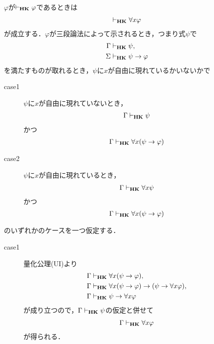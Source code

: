 	\begin{sketch}
		$\varphi$が$\vdash_{{\scriptsize \mbox{{\bf HK}}}} \varphi$であるときは
		\begin{align}
			\vdash_{{\scriptsize \mbox{{\bf HK}}}} \forall x \varphi
		\end{align}
		が成立する．$\varphi$が三段論法によって示されるとき，つまり式$\psi$で
		\begin{align}
			\Gamma &\vdash_{{\scriptsize \mbox{{\bf HK}}}} \psi, \\
			\Sigma &\vdash_{{\scriptsize \mbox{{\bf HK}}}} \psi \rightarrow \varphi
		\end{align}
		を満たすものが取れるとき，$\psi$に$x$が自由に現れているかいないかで
		\begin{description}
			\item[case1] $\psi$に$x$が自由に現れていないとき，
				\begin{align}
					\Gamma \vdash_{{\scriptsize \mbox{{\bf HK}}}} \psi
				\end{align}
				かつ
				\begin{align}
					\Gamma \vdash_{{\scriptsize \mbox{{\bf HK}}}} \forall x (\psi \rightarrow \varphi)
				\end{align}
				
			\item[case2] $\psi$に$x$が自由に現れているとき，
				\begin{align}
					\Gamma \vdash_{{\scriptsize \mbox{{\bf HK}}}} \forall x \psi
				\end{align}
				かつ
				\begin{align}
					\Gamma \vdash_{{\scriptsize \mbox{{\bf HK}}}} \forall x (\psi \rightarrow \varphi)
				\end{align}
		\end{description}
		のいずれかのケースを一つ仮定する．
		\begin{description}
			\item[case1] 量化公理(UI)より
				\begin{align}
					\Gamma &\vdash_{{\scriptsize \mbox{{\bf HK}}}} \forall x (\psi \rightarrow \varphi), \\
					\Gamma &\vdash_{{\scriptsize \mbox{{\bf HK}}}} \forall x (\psi \rightarrow \varphi) \rightarrow (\psi \rightarrow \forall x \varphi), \\
					\Gamma &\vdash_{{\scriptsize \mbox{{\bf HK}}}} \psi \rightarrow \forall x \varphi
				\end{align}
				が成り立つので，$\Gamma \vdash_{{\scriptsize \mbox{{\bf HK}}}} \psi$の仮定と併せて
				\begin{align}
					\Gamma \vdash_{{\scriptsize \mbox{{\bf HK}}}} \forall x \varphi
				\end{align}
				が得られる．
				

\end{description}
\end{sketch}
